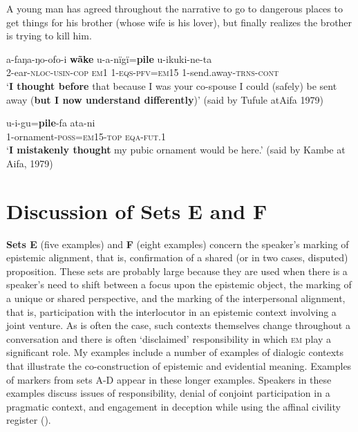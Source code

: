 \documentclass[output=paper]{langsci/langscibook}
\begin{document}
A young man has agreed throughout the narrative to go to dangerous places to get things  for his brother (whose wife is his lover), but finally realizes the brother is trying to kill him. 

\begin{exe}
	\ex \label{ex:eb38}
	\gll a-faŋa-ŋo-ofo-i \textbf{wãke} u-a-nïgï=\textbf{pile} u-ikuki-ne-ta\\ %
	2-ear-\textsc{nloc-usin-cop} \textsc{em1} 1-\textsc{eqs-pfv=em15} 1-send.away-\textsc{trns-cont}\\
	\trans ‘\textbf{I thought before} that because I was your co-spouse I could (safely) be sent away (\textbf{but I now understand differently})’ (said by Tufule atAifa 1979)
\end{exe}

\begin{exe}
	\ex
	\gll u-i-gu=\textbf{pile}-fa ata-ni\\
	1-ornament-\textsc{poss=em15-top} \textsc{eqa-fut.1}\\
	\trans ‘\textbf{I mistakenly thought} my pubic ornament would be here.’ (said by Kambe at Aifa, 1979)
\end{exe}


\section{Discussion of Sets E and F}\label{s:eb4}
\largerpage
\textbf{Sets E} (five examples) and \textbf{F} (eight examples) concern the speaker’s marking of epistemic alignment, that is,  confirmation of a shared (or in two cases, disputed) proposition.  These sets are probably large because they are used when there is a speaker’s need to shift between a focus upon the epistemic object, the marking of a unique or shared perspective, and the marking of the interpersonal alignment, that is, participation with the interlocutor in an epistemic context involving a joint venture.  As is often the case, such contexts themselves change throughout  a conversation and there is often ‘disclaimed’ responsibility in which \textsc{em} play a significant role.  My examples include a number of examples of dialogic contexts that illustrate the  co-construction of epistemic and evidential meaning.  Examples of markers from sets A-D appear in these longer examples. Speakers in these examples discuss issues of responsibility, denial of conjoint participation in a pragmatic context, and engagement in deception while using the affinal civility register (\citealt{Basso2007}).
\end{document}
